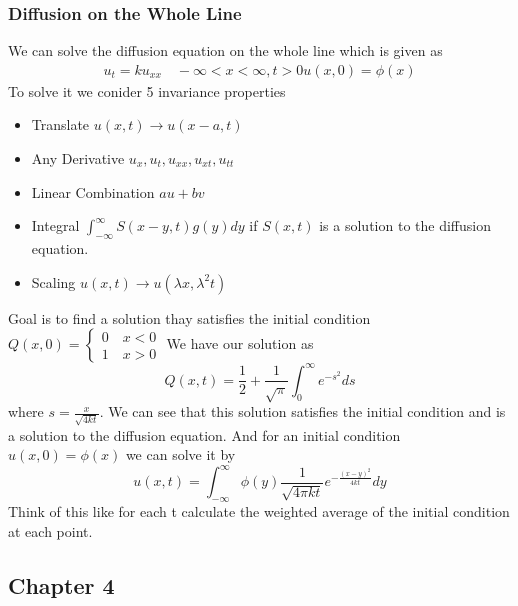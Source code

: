 \documentclass[answers,12pt,addpoints]{exam}
\begin{document}
    \subsubsection{Diffusion on the Whole Line}
    We can solve the diffusion equation on the whole line which is given as 
    \begin{align*}
        u_t = k u_{xx} \quad -\infty < x < \infty, t > 0
        u(x, 0) = \phi(x)
    \end{align*}
    To solve it we conider 5 invariance properties
    \begin{itemize}
        \item Translate $u(x, t) \to u(x - a, t)$
        \item Any Derivative $u_x, u_t, u_{xx}, u_{xt}, u_{tt}$
        \item Linear Combination $au + bv$
        \item Integral $\int_{-\infty}^{\infty} S(x-y,t) g(y)dy$ if $S(x, t)$ is a solution to the diffusion equation.
        \item Scaling $u(x, t) \to u(\lambda x, \lambda^2 t)$
    \end{itemize}
    Goal is to find a solution thay satisfies the initial condition $Q(x,0)= \begin{cases}
        0 \quad x < 0\\
        1 \quad x > 0
    \end{cases}$ 
    We have our solution as 
    $$ Q(x,t) = \frac{1}{2} + \frac{1}{\sqrt{\pi}} \int_{0}^{\infty} e^{-s^2} ds$$
    where $s = \frac{x}{\sqrt{4kt}}$. We can see that this solution satisfies the initial condition and is a solution to the diffusion equation.
    And for an initial condition $u(x, 0) = \phi(x)$ we can solve it by
    $$ u(x, t) = \int_{-\infty}^{\infty} \phi(y) \frac{1}{\sqrt{4 \pi k t}} e^{-\frac{(x-y)^2}{4kt}} dy$$
    Think of this like for each t calculate the weighted average of the initial condition at each point.

    \subsection{Chapter 4}
\end{document}
